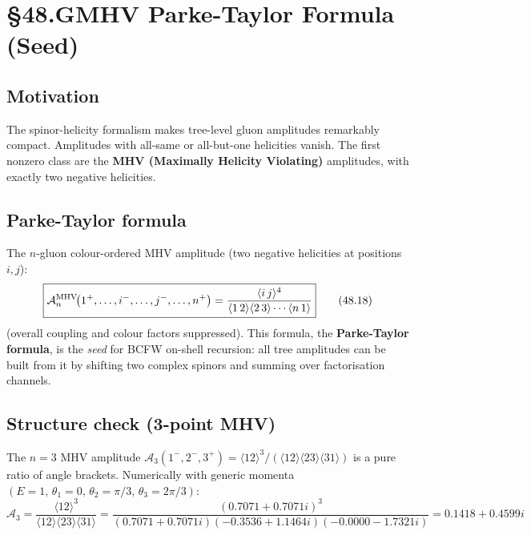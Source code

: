 
\section{§48.G\quad MHV Parke-Taylor Formula (Seed)}

\subsection{Motivation}

The spinor-helicity formalism makes tree-level gluon amplitudes remarkably
compact.  Amplitudes with all-same or all-but-one helicities vanish.
The first nonzero class are the \textbf{MHV (Maximally Helicity Violating)}
amplitudes, with exactly two negative helicities.

\subsection{Parke-Taylor formula}

The $n$-gluon colour-ordered MHV amplitude (two negative helicities at positions $i,j$):
\begin{equation}
  \boxed{
    \mathcal{A}_n^{\rm MHV}\!\bigl(1^+,\ldots,i^-,\ldots,j^-,\ldots,n^+\bigr)
    = \frac{\langle i\,j\rangle^4}
           {\langle 1\,2\rangle\langle 2\,3\rangle\cdots\langle n\,1\rangle}
  }
  \tag{48.18}
\end{equation}
(overall coupling and colour factors suppressed).
This formula, the \textbf{Parke-Taylor formula}, is the \emph{seed} for BCFW
on-shell recursion: all tree amplitudes can be built from it by shifting two
complex spinors and summing over factorisation channels.

\subsection{Structure check (3-point MHV)}

The $n=3$ MHV amplitude
$\mathcal{A}_3(1^-,2^-,3^+) = \langle12\rangle^3/(\langle12\rangle\langle23\rangle\langle31\rangle)$
is a pure ratio of angle brackets.  Numerically with generic momenta
$(E=1,\,\theta_1=0,\,\theta_2=\pi/3,\,\theta_3=2\pi/3)$:
\[
  \mathcal{A}_3 = \frac{\langle12\rangle^3}{\langle12\rangle\langle23\rangle\langle31\rangle}
  = \frac{(0.7071+0.7071i)^3}{(0.7071+0.7071i)(-0.3536+1.1464i)(-0.0000-1.7321i)}
  = 0.1418+0.4599i
\]

